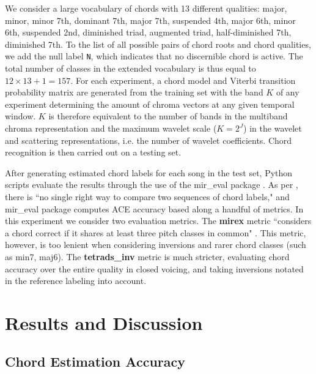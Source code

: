 \documentclass{article}
\makeatletter
\newcommand*{\ie}{i.e.\@\xspace}
\makeatother
\begin{document}
We consider a large vocabulary of chords with 13 different qualities:
major, minor, minor 7th, dominant 7th, major 7th, suspended 4th, major 6th, minor 6th, suspended 2nd, diminished triad, augmented triad, half-diminished 7th, diminished 7th.
To the list of all possible pairs of chord roots and chord qualities,
we add the null label \texttt{N}, which indicates that no discernible chord is active.
The total number of classes in the extended vocabulary is thus equal to
$12 \times 13 + 1 = 157$.
For each experiment, a chord model and Viterbi transition probability matrix are generated from the  training set with the band $K$ of any experiment determining the amount of chroma vectors at any given temporal window.
$K$ is therefore equivalent to the number of bands in the multiband chroma representation and the maximum wavelet scale ($K = 2^J$) in the wavelet and scattering representations, \ie the number of wavelet coefficients.
Chord recognition is then carried out on a testing set.

After generating estimated chord labels for each song in the test set, Python scripts evaluate the results through the use of the mir\_eval package \cite{raffel2014mir}.
As per \cite{raffel2014mir}, there is ``no single right way to compare two sequences of chord labels,"
and mir\_eval package computes ACE accuracy based along a handful of metrics.
In this experiment we consider two evaluation metrics. The \textbf{mirex} metric ``considers a chord
correct if it shares at least three pitch classes in common" \cite{raffel2014mir}. This metric, however, is too lenient when considering inversions and rarer chord classes (such as min7, maj6). The \textbf{tetrads\_inv} metric is much stricter, evaluating chord accuracy over the entire quality in closed voicing, and taking inversions notated in the reference labeling into account.


	
\section{Results and Discussion}\label{sec:results}

\subsection{Chord Estimation Accuracy}
\end{document}
